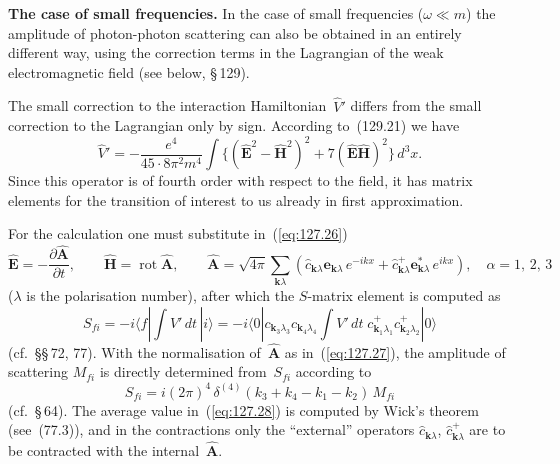 
\par\noindent

\textbf{The case of small frequencies.} In the case of small frequencies ($\omega \ll m$) the amplitude of photon-photon scattering can also be obtained in an entirely different way, using the correction terms in the Lagrangian of the weak electromagnetic field (see below, \S\,129).

The small correction to the interaction Hamiltonian~$\hat{V}'$ differs from the small correction to the Lagrangian only by sign. According to~(129.21) we have
\begin{equation}
\hat{V}' = -\frac{e^4}{45\cdot 8\pi^2 m^4}\int\bigl\{(\hat{\mathbf{E}}^2 - \hat{\mathbf{H}}^2)^2 + 7(\hat{\mathbf{E}}\hat{\mathbf{H}})^2\bigr\}\,d^3x.
\label{eq:127.26}
\end{equation}
Since this operator is of fourth order with respect to the field, it has matrix elements for the transition of interest to us already in first approximation.

For the calculation one must substitute in~(\ref{eq:127.26})
\begin{equation}
\hat{\mathbf{E}} = -\frac{\partial\hat{\mathbf{A}}}{\partial t},\qquad \hat{\mathbf{H}} = \operatorname{rot}\hat{\mathbf{A}},\qquad \hat{\mathbf{A}} = \sqrt{4\pi}\sum_{\mathbf{k}\lambda}(\hat{c}_{\mathbf{k}\lambda}\mathbf{e}_{\mathbf{k}\lambda}\,e^{-ikx} + \hat{c}^+_{\mathbf{k}\lambda}\mathbf{e}^*_{\mathbf{k}\lambda}\,e^{ikx}),\quad \alpha = 1,\,2,\,3
\label{eq:127.27}
\end{equation}
($\lambda$ is the polarisation number), after which the $S$-matrix element is computed as
\begin{equation}
S_{fi} = -i\langle f|\int V'\,dt\,|i\rangle = -i\langle 0|c_{\mathbf{k}_3\lambda_3}c_{\mathbf{k}_4\lambda_4}\int V'\,dt\;c^+_{\mathbf{k}_1\lambda_1}c^+_{\mathbf{k}_2\lambda_2}|0\rangle
\label{eq:127.28}
\end{equation}
(cf.\ \S\S\,72, 77). With the normalisation of~$\hat{\mathbf{A}}$ as in~(\ref{eq:127.27}), the amplitude of scattering $M_{fi}$ is directly determined from~$S_{fi}$ according to
\begin{equation}
S_{fi} = i(2\pi)^4\,\delta^{(4)}(k_3 + k_4 - k_1 - k_2)\,M_{fi}
\label{eq:127.29}
\end{equation}
(cf.\ \S\,64). The average value in~(\ref{eq:127.28}) is computed by Wick's theorem (see~(77.3)), and in the contractions only the ``external'' operators $\hat{c}_{\mathbf{k}\lambda}$, $\hat{c}^+_{\mathbf{k}\lambda}$ are to be contracted with the internal~$\hat{\mathbf{A}}$.
